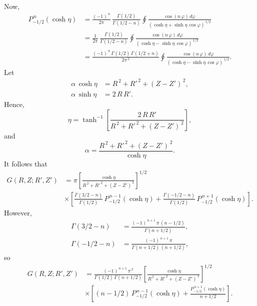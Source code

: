 \documentclass[notitlepage,12pt]{article}
\begin{document}
Now, 
\begin{align}
P^{\,n}_{-1/2}(\cosh\eta) &= \frac{(-1)^{\,n}}{2\pi}\,\frac{\Gamma(1/2)}{\Gamma(1/2-n)}\oint \frac{\cos(n\,\varphi)\,d\varphi}{(\cosh\eta+\sinh\eta\,\cos\varphi)^{\,1/2}}\nonumber\\[0.5ex]
 &=\frac{1}{2\pi}\,\frac{\Gamma(1/2)}{\Gamma(1/2-n)}\oint \frac{\cos(n\,\varphi)\,d\varphi}{(\cosh\eta-\sinh\eta\,\cos\varphi)^{\,1/2}}\nonumber\\[0.5ex]
 &=\frac{(-1)^{\,n}\,\Gamma(1/2)\,\Gamma(1/2+n)}{2\pi^{\,2}}\oint
 \frac{\cos(n\,\varphi)\,d\varphi}{(\cosh\eta-\sinh\eta\,\cos\varphi)^{\,1/2}}.
\end{align}
Let
\begin{align}
\alpha\,\cosh\eta &= R^{\,2} +R'^{\,2} + (Z-Z')^{\,2},\\[0.5ex]
\alpha\,\sinh\eta &= 2\,R\,R'.
\end{align}
Hence,
\begin{equation}
\eta = \tanh^{-1}\left[\frac{2\,R\,R'}{R^{\,2}+R'^{\,2}+(Z-Z')^{\,2}}\right],
\end{equation}
and
\begin{equation}
\alpha = \frac{R^{\,2} +R'^{\,2} + (Z-Z')^{\,2}}{\cosh\eta}.
\end{equation}
It follows that
\begin{align}
G(R,Z;R',Z')&=\pi\left[\frac{\cosh\eta}{R^{\,2}+R'^{\,2}+(Z-Z')^{\,2}}\right]^{1/2}\nonumber\\[0.5ex]
&
\times\left[\frac{\Gamma(3/2-n)}{\Gamma(1/2)}\,P_{-1/2}^{\,n-1}(\cosh\eta)
+ \frac{\Gamma(-1/2-n)}{\Gamma(1/2)}\,P_{-1/2}^{\,n+1}(\cosh\eta)\right].
\end{align}
However,
\begin{align}
{\Gamma}(3/2-n)  &=\frac{(-1)^{\,n+1}\,\pi\,(n-1/2)}{\Gamma(n+1/2)},\\[0.5ex]
{\Gamma}(-1/2-n)&= \frac{(-1)^{\,n+1}\,\pi}{\Gamma(n+1/2)\,(n+1/2)},
\end{align}
so
\begin{align}
G(R,Z;R',Z')&= \frac{(-1)^{\,n+1}\,\pi^{\,2}}{\Gamma(1/2)\,\Gamma(n+1/2)}
\left[\frac{\cosh\eta}{R^{\,2}+R'^{\,2}+(Z-Z')^{\,2}}\right]^{1/2}\nonumber\\[0.5ex]
&\times\left[(n-1/2)\,P_{-1/2}^{\,n-1}(\cosh\eta)+
\frac{P_{-1/2}^{\,n+1}(\cosh\eta)}{n+1/2}\right].
\end{align}
\end{document}
